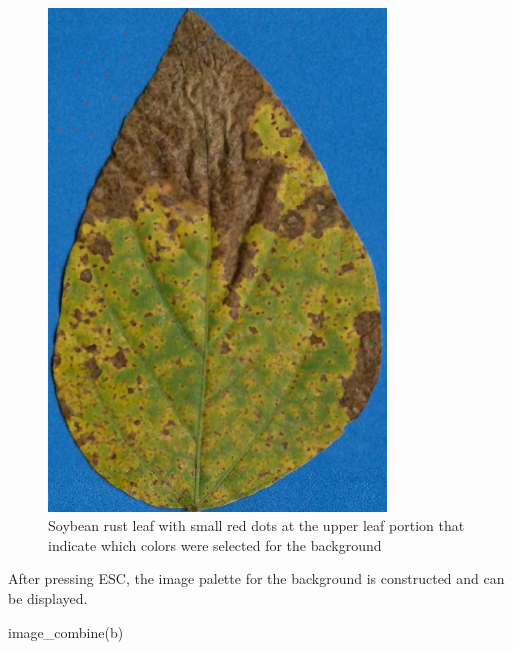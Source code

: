 \documentclass[
  letterpaper,
]{book}
\newenvironment{Shaded}{\begin{snugshade}}{\end{snugshade}}
\newcommand{\FunctionTok}[1]{\textcolor[rgb]{0.28,0.35,0.67}{#1}}
\newcommand{\NormalTok}[1]{\textcolor[rgb]{0.00,0.23,0.31}{#1}}
\begin{document}
\begin{figure}

{\centering \includegraphics[width=3.53125in,height=\textheight]{imgs/sbr_pick_palette.png}

}

\caption{Soybean rust leaf with small red dots at the upper leaf portion
that indicate which colors were selected for the background}

\end{figure}

After pressing ESC, the image palette for the background is constructed
and can be displayed.

\begin{Shaded}
\begin{Highlighting}[]
\FunctionTok{image\_combine}\NormalTok{(b)}
\end{Highlighting}
\end{Shaded}
\end{document}
